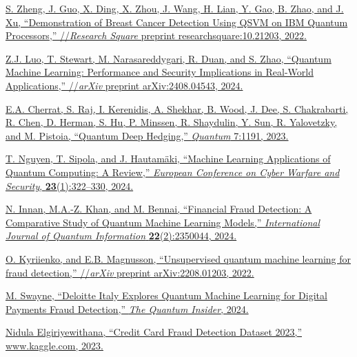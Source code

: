 \documentclass[11pt, oneside]{article}   	%
\begin{document}
\begin{enumerate}[label={[{\arabic*}]}]
   \item \href{https://doi.org/10.21203/rs.3.rs-1434074/v1}{S. Zheng, J. Guo, X. Ding, X. Zhou, J. Wang, H. Lian, Y. Gao, B. Zhao, and J. Xu, “Demonstration of Breast Cancer Detection Using QSVM on IBM Quantum Processors,” //\textit{Research Square} preprint researchsquare:10.21203, 2022.}
   
   \item \href{https://doi.org/10.48550/arXiv.2408.04543}{Z.J. Luo, T. Stewart, M. Narasareddygari, R. Duan, and S. Zhao, “Quantum Machine Learning: Performance and Security Implications in Real-World Applications,” //\textit{arXiv} preprint arXiv:2408.04543, 2024.}
   
   \item \href{https://doi.org/10.22331/q-2023-11-29-1191}{E.A. Cherrat, S. Raj, I. Kerenidis, A. Shekhar, B. Wood, J. Dee, S. Chakrabarti, R. Chen, D. Herman, S. Hu, P. Minssen, R. Shaydulin, Y. Sun, R. Yalovetzky, and M. Pistoia, “Quantum Deep Hedging,” \textit{Quantum} 7:1191, 2023.}
   
   \item \href{https://doi.org/10.34190/eccws.23.1.2258}{T. Nguyen, T. Sipola, and J. Hautamäki, “Machine Learning Applications of Quantum Computing: A Review,” \textit{European Conference on Cyber Warfare and Security}, \textbf{23}(1):322–330, 2024.}
   
   \item \href{https://doi.org/10.1142/S0219749923500442}{N. Innan, M.A.-Z. Khan, and M. Bennai, “Financial Fraud Detection: A Comparative Study of Quantum Machine Learning Models,” \textit{International Journal of Quantum Information} \textbf{22}(2):2350044, 2024.}
   
   \item \href{https://doi.org/10.48550/arXiv.2208.01203}{O. Kyriienko, and E.B. Magnusson, “Unsupervised quantum machine learning for fraud detection,” //\textit{arXiv} preprint arXiv:2208.01203, 2022.}
   
   \item \href{https://thequantuminsider.com/2024/07/19/deloitte-italy-explores-quantum-machine-learning-for-digital-payments-fraud-detection/}{M. Swayne, “Deloitte Italy Explores Quantum Machine Learning for Digital Payments Fraud Detection,” \textit{The Quantum Insider}, 2024.}
   
   \item \href{https://www.kaggle.com/datasets/nelgiriyewithana/credit-card-fraud-detection-dataset-2023}{Nidula Elgiriyewithana, “Credit Card Fraud Detection Dataset 2023,” www.kaggle.com, 2023.}
   

\end{enumerate}
\end{document}

